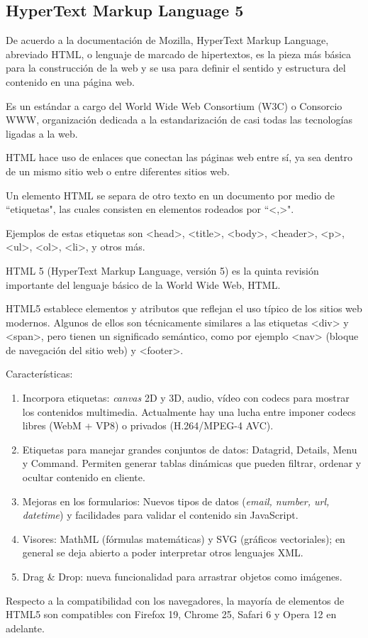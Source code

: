 \subsection*{HyperText Markup Language 5}
De acuerdo a la documentación de Mozilla\cite{noauthor_html_nodate}, HyperText Markup Language, abreviado HTML, o lenguaje de marcado de hipertextos, es la pieza más básica para la construcción de la web y se usa para definir el sentido y estructura del contenido en una página web. 


Es un estándar a cargo del World Wide Web Consortium (W3C) o Consorcio WWW, organización dedicada a la estandarización de casi todas las tecnologías ligadas a la web. 


HTML hace uso de enlaces que conectan las páginas web entre sí, ya sea dentro de un mismo sitio web o entre diferentes sitios web.


Un elemento HTML se separa de otro texto en un documento por medio de ``etiquetas", las cuales consisten en elementos rodeados por ``<,>".


Ejemplos de estas etiquetas son <head>, <title>, <body>, <header>, <p>, <ul>, <ol>, <li>, y otros más.


HTML 5 (HyperText Markup Language, versión 5) es la quinta revisión importante del lenguaje básico de la World Wide Web, HTML.


HTML5 establece elementos y atributos que reflejan el uso típico de los sitios web modernos. Algunos de ellos son técnicamente similares a las etiquetas <div> y <span>, pero tienen un significado semántico, como por ejemplo <nav> (bloque de navegación del sitio web) y <footer>.


Características:

\begin{enumerate}
    \item Incorpora etiquetas: \textit{canvas} 2D y 3D, audio, vídeo con codecs para mostrar los contenidos multimedia. Actualmente hay una lucha entre imponer codecs libres (WebM + VP8) o privados (H.264/MPEG-4 AVC).
    \item Etiquetas para manejar grandes conjuntos de datos: Datagrid, Details, Menu y Command. Permiten generar tablas dinámicas que pueden filtrar, ordenar y ocultar contenido en cliente.
    \item Mejoras en los formularios: Nuevos tipos de datos (\textit{email, number, url, datetime})  y facilidades para validar el contenido sin JavaScript.
    \item Visores: MathML (fórmulas matemáticas) y SVG (gráficos vectoriales); en general se deja abierto a poder interpretar otros lenguajes XML.
    \item Drag \& Drop: nueva funcionalidad para arrastrar objetos como imágenes.
\end{enumerate}

Respecto a la compatibilidad con los navegadores, la mayoría de elementos de HTML5 son compatibles con Firefox 19, Chrome 25, Safari 6 y Opera 12 en adelante.